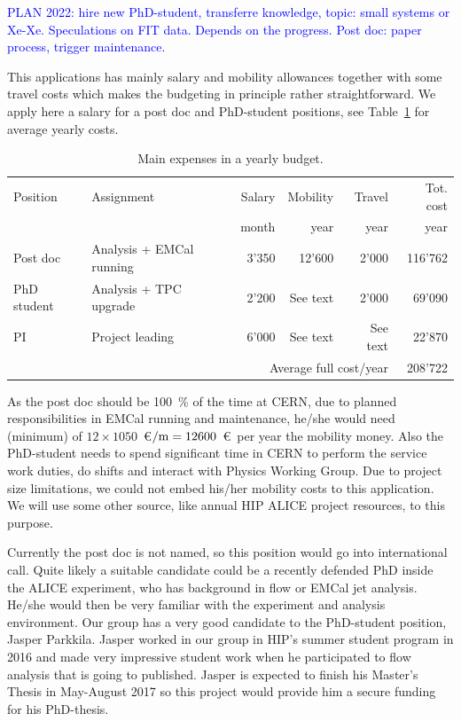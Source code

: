 \textcolor{blue}{PLAN 2022: hire new PhD-student, transferre knowledge, topic: small systems or Xe-Xe. Speculations on FIT data. Depends on the progress. Post doc: paper process, trigger maintenance.}

This applications has mainly salary and mobility allowances together with some travel costs which makes the budgeting in principle rather straightforward. We apply here a salary for a post doc and PhD-student positions, see Table~\ref{tab:money} for average yearly costs.
\begin{table}[htp]
\caption{Main expenses in a yearly budget.}
\begin{center}
\begin{tabular}{l|l|r|r|r|r}
Position & Assignment & Salary & Mobility & Travel & Tot. cost\\
& & month & year & year & year \\\hline
Post doc & Analysis + EMCal running    & 3'350 & 12'600 & 2'000 & 116'762\\
PhD student & Analysis + TPC upgrade & 2'200 &  See text   & 2'000 & 69'090 \\
PI & Project leading & 6'000 &  See text   & See text & 22'870 \\
\multicolumn{5}{r}{Average full cost/year} & 208'722  \\
\end{tabular}
\end{center}
\label{tab:money}
\end{table}
As the post doc should be 100~\% of the time at CERN, due to planned responsibilities in EMCal running and maintenance, he/she would need (minimum) of $12\times1050$~\euro$/{\rm m}=12600$~\euro\ per year the mobility money. Also the PhD-student needs to spend significant time in CERN to perform the service work duties, do shifts and interact with Physics Working Group. Due to project size limitations, we could not embed his/her mobility costs to this application. We will use some other source, like annual HIP ALICE project resources, to this purpose.

Currently the post doc is not named, so this position would go into international call. Quite likely a suitable candidate could be a recently defended PhD inside the ALICE experiment, who has background in flow or EMCal jet analysis. He/she would then be very familiar with the experiment and analysis environment. Our group has a very good candidate to the PhD-student position, Jasper Parkkila. Jasper worked in our group in HIP's summer student program in 2016 and made very impressive student work when he participated to flow analysis that is going to published. Jasper is expected to finish his Master's Thesis in May-August 2017 so this project would provide him a secure funding for his PhD-thesis.


